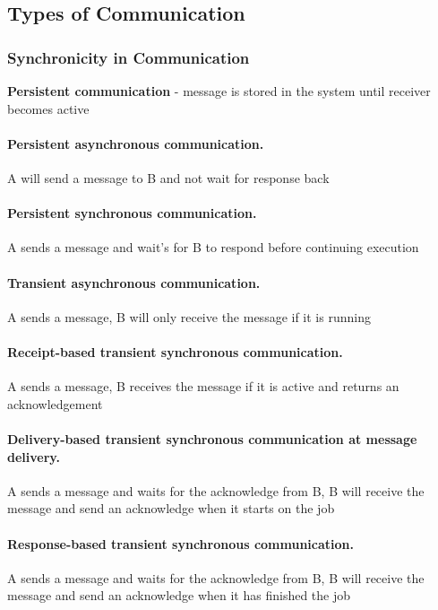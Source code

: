 \subsection{Types of Communication}
\subsubsection{Synchronicity in Communication}
\begin{leftbar}
	\textbf{Persistent communication} - message is stored in the system until receiver becomes active	
\end{leftbar}

\paragraph{Persistent asynchronous communication.} A will send a message to B and not wait for response back
\paragraph{Persistent synchronous communication.} A sends a message and wait's for B to respond before continuing execution
\paragraph{Transient asynchronous communication.} A sends a message, B will only receive the message if it is running
\paragraph{Receipt-based transient synchronous communication.} A sends a message, B receives the message if it is active and returns an acknowledgement
\paragraph{Delivery-based transient synchronous communication at message delivery.} A sends a message and waits for the acknowledge from B, B will receive the message and send an acknowledge when it starts on the job
\paragraph{Response-based transient synchronous communication.} A sends a message and waits for the acknowledge from B, B will receive the message and send an acknowledge when it has finished the job

